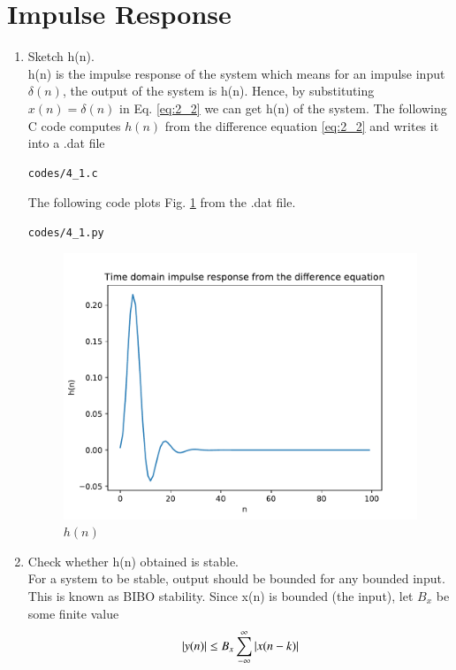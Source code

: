 \documentclass[journal,12pt,twocolumn]{IEEEtran}
\renewcommand\thesection{\arabic{section}}
\begin{document}
\section{Impulse Response}
\begin{enumerate}[label=\thesection.\arabic*,ref=\thesection.\theenumi]
\item
Sketch h(n).
\label{prob:4_1}
\\
\solution
h(n) is the impulse response of the system which means for an impulse input $\delta(n)$, the output of the system is h(n). Hence, by substituting $x(n)= \delta(n)$ in Eq. \eqref{eq:2_2} we can get h(n) of the system.
The following C code computes $h(n)$ from the difference equation \eqref{eq:2_2} and writes it into a .dat file
\begin{lstlisting}
codes/4_1.c
\end{lstlisting}
The following code plots Fig. \ref{fig:4_1} from the .dat file.
\begin{lstlisting}
codes/4_1.py
\end{lstlisting}
\begin{figure}[!ht]
\centering
\includegraphics[width=\columnwidth]{./figs/4_1}
\caption{$h(n)$}
\label{fig:4_1}
\end{figure}
\item Check whether h(n) obtained is stable.
\\
\solution
For a system to be stable, output should be bounded for any bounded input. This is known as BIBO stability.
Since x(n) is bounded (the input), let $B_{x}$ be some finite value
\begin{equation}
\abs{y(n)} \leq B_{x}\sum_{-\infty}^{\infty} \abs{x(n-k)}

\end{equation}
\end{enumerate}
\end{document}
